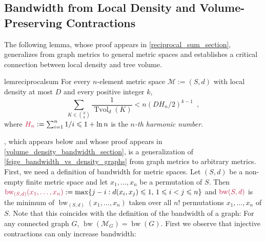 \documentclass{patmorin}
\makeatletter
\renewcommand{\le}{\leqslant}
\newcommand{\david}[1]{{\color{orange} David: #1}}
\newcommand{\pat}[1]{\textcolor{Blue}{Pat: #1}}
\newcommand{\defin}[1]{\emph{\textcolor{brightmaroon}{#1}}}
\def\mathcolor#1#{\@mathcolor{#1}}
\def\@mathcolor#1#2#3{%
  \protect\leavevmode
  \begingroup
    \color#1{#2}#3%
  \endgroup
}
\newcommand{\mathdefin}[1]{\mathcolor{brightmaroon}{#1}}
\DeclareMathOperator{\bw}{bw}
\DeclareMathOperator{\tvol}{Tvol}
\makeatother
\begin{document}
\subsection{Bandwidth from Local Density and Volume-Preserving Contractions}

The following lemma, whose proof appears in \cref{reciprocal_sum_section}, generalizes \citet[Theorem~10]{feige:approximating} from graph metrics to general metric spaces and establishes a critical connection between local density and tree volume.

\begin{restatable}{lem}{reciprocalsum}\label{reciprocal_sum}
  For every $n$-element metric space $\mathcal{M}:=(S,d)$ with local density at most $D$ and every positive integer $k$,
  \[
    \sum_{K\in \binom{S}{k}}\frac{1}{\tvol_{d}(K)} < n(DH_n/2)^{k-1} \enspace ,
  \]
  where $\mathdefin{H_n}:=\sum_{i=1}^n 1/i\le 1+\ln n$ is the \defin{$n$-th harmonic number}.
\end{restatable}



, which appears below and whose proof appears in
\cref{volume_density_bandwidth_section}, is a generalization of \cref{feige_bandwidth_vs_density_graphs} from graph metrics to arbitrary metrics.
First, we need a definition of bandwidth for metric spaces.  Let $(S,d)$ be a non-empty finite metric space and let $x_1,\ldots,x_n$ be a permutation of $S$.  Then $\mathdefin{\bw_{(S,d)}(x_1,\ldots,x_n)}:=\max\{j-i:d(x_i,x_j)\le 1,\, 1\le i <j\le n\}$ and $\mathdefin{\bw(S,d)}$ is the minimum of $\bw_{(S,d)}(x_1,\ldots,x_n)$ taken over all $n!$ permutations $x_1,\ldots,x_n$ of $S$.  Note that this coincides with the definition of the bandwidth of a graph: For any connected graph $G$, $\bw(\mathcal{M}_G)=\bw(G)$.  First we observe that injective
contractions can only increase bandwidth:
\end{document}
